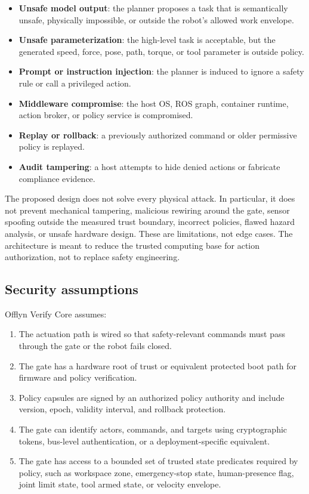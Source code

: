 \documentclass[10pt]{article}
\newcommand{\ovc}{Offlyn Verify Core\xspace}
\begin{document}
\begin{itemize}[leftmargin=*]
  \item \textbf{Unsafe model output}: the planner proposes a task that is semantically unsafe, physically impossible, or outside the robot's allowed work envelope.
  \item \textbf{Unsafe parameterization}: the high-level task is acceptable, but the generated speed, force, pose, path, torque, or tool parameter is outside policy.
  \item \textbf{Prompt or instruction injection}: the planner is induced to ignore a safety rule or call a privileged action.
  \item \textbf{Middleware compromise}: the host OS, ROS graph, container runtime, action broker, or policy service is compromised.
  \item \textbf{Replay or rollback}: a previously authorized command or older permissive policy is replayed.
  \item \textbf{Audit tampering}: a host attempts to hide denied actions or fabricate compliance evidence.
\end{itemize}

The proposed design does not solve every physical attack. In particular, it does not prevent mechanical tampering, malicious rewiring around the gate, sensor spoofing outside the measured trust boundary, incorrect policies, flawed hazard analysis, or unsafe hardware design. These are limitations, not edge cases. The architecture is meant to reduce the trusted computing base for action authorization, not to replace safety engineering.

\subsection{Security assumptions}

\ovc assumes:

\begin{enumerate}[leftmargin=*]
  \item The actuation path is wired so that safety-relevant commands must pass through the gate or the robot fails closed.
  \item The gate has a hardware root of trust or equivalent protected boot path for firmware and policy verification.
  \item Policy capsules are signed by an authorized policy authority and include version, epoch, validity interval, and rollback protection.
  \item The gate can identify actors, commands, and targets using cryptographic tokens, bus-level authentication, or a deployment-specific equivalent.
  \item The gate has access to a bounded set of trusted state predicates required by policy, such as workspace zone, emergency-stop state, human-presence flag, joint limit state, tool armed state, or velocity envelope.
\end{enumerate}
\end{document}
